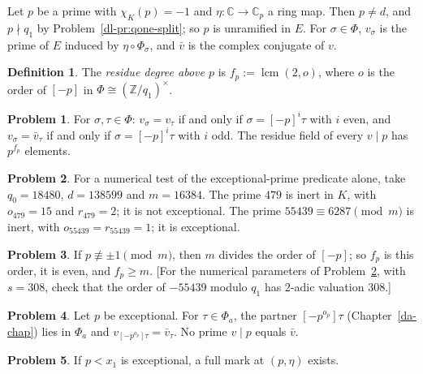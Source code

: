 \documentclass[reqno]{amsart}
\newcounter{chap}
\theoremstyle{plain}
\theoremstyle{definition}
\newtheorem{problem}{Problem}[section]
\newtheorem{definition}[theorem]{Definition}
\theoremstyle{remark}
\newcommand{\Z}{\mathbb{Z}}
\newcommand{\C}{\mathbb{C}}
\begin{document}
Let \(p\) be a prime with \(\chi_K(p) = -1\) and \(\eta\colon \C \to \C_p\) a ring map.  Then \(p \ne d\), and \(p \nmid q_1\) by Problem~\ref{dl-pr:qone-split}; so \(p\) is unramified in \(E\).  For \(\sigma \in \Phi\), \(v_\sigma\) is the prime of \(E\) induced by \(\eta \circ \Phi_\sigma\), and \(\bar v\) is the complex conjugate of \(v\).

\begin{definition}\label{def:fp}
The \emph{residue degree above \(p\)} is \(f_p := \operatorname{lcm}(2, o)\), where \(o\) is the order of \([-p]\) in \(\Phi \cong (\Z/q_1)^\times\).
\end{definition}

\begin{problem}\label{pr:decomposition}
For \(\sigma, \tau \in \Phi\): \(v_\sigma = v_\tau\) if and only if \(\sigma = [-p]^i\tau\) with \(i\) even, and \(v_\sigma = \bar v_\tau\) if and only if \(\sigma = [-p]^i\tau\) with \(i\) odd.  The residue field of every \(v \mid p\) has \(p^{f_p}\) elements.
\end{problem}

\begin{problem}\label{pr:o-r}
For a numerical test of the exceptional-prime predicate alone, take \(q_0=18480\), \(d=138599\) and \(m=16384\).  The prime \(479\) is inert in \(K\), with \(o_{479} = 15\) and \(r_{479} = 2\); it is not exceptional.  The prime \(55439 \equiv 6287 \pmod m\) is inert, with \(o_{55439} = r_{55439} = 1\); it is exceptional.
\end{problem}

\begin{problem}\label{pr:m-divides}
If \(p \not\equiv \pm 1 \pmod m\), then \(m\) divides the order of \([-p]\); so \(f_p\) is this order, it is even, and \(f_p \ge m\).  [For the numerical parameters of Problem~\ref{pr:o-r}, with \(s=308\), check that the order of \(-55439\) modulo \(q_1\) has \(2\)-adic valuation \(308\).]
\end{problem}

\begin{problem}\label{pr:orbit}
Let \(p\) be exceptional.  For \(\tau \in \Phi_a\), the partner \([-p^{o_p}]\tau\) (Chapter~\ref{da-chap}) lies in \(\Phi_a\) and \(v_{[-p^{o_p}]\tau} = \bar v_\tau\).  No prime \(v \mid p\) equals \(\bar v\).
\end{problem}

\begin{problem}\label{pr:full-mark-exists}
If \(p < x_1\) is exceptional, a full mark at \((p, \eta)\) exists.
\end{problem}
\end{document}
